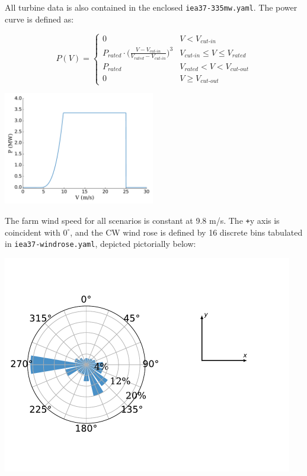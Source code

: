 \documentclass[10pt]{article}
\begin{document}
        \noindent All turbine data is also contained in the enclosed \texttt{iea37-335mw.yaml}. The power curve is defined as:   

        \begin{minipage}{0.53\textwidth}
            \begin{equation*}
                P(V) = 
                \begin{cases} 
                    0 & V < V_{\textit{cut-in}} \\
                    P_{\textit{rated}}\cdot\bigg(\frac{V-V_{\textit{cut-in}}}{V_{\textit{rated}}-V_{\textit{cut-in}}}\bigg)^3 & V_{\textit{cut-in}}\leq V \leq V_{\textit{rated}} \\
                    P_{\textit{rated}} & V_{\textit{rated}} < V < V_{\textit{cut-out}} \\
                    0 & V \geq V_{\textit{cut-out}}
                \end{cases}
            \label{eq:power}
            \end{equation*}
        \end{minipage}\quad
        \begin{minipage}{0.53\textwidth}
            \includegraphics[width=2.6in]{iea37-335mw-pcurve}
        \end{minipage}

        The farm wind speed for all scenarios is constant at 9.8 m/s. The \texttt{+}y axis is coincident with $0^{\circ}$, and the CW wind rose is defined by 16 discrete bins tabulated in \texttt{iea37-windrose.yaml}, depicted pictorially below:
       \vspace{-4.5em}
        \begin{center}
            \includegraphics[width=5in]{iea37-windrose-axis}
        \end{center}
        \vspace{-5em}
\end{document}
